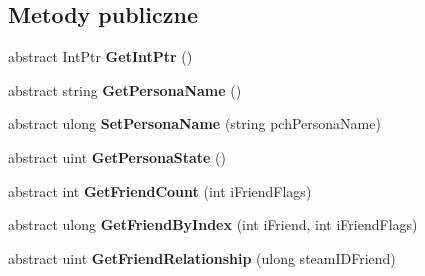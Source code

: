 \subsection*{Metody publiczne}
\begin{DoxyCompactItemize}
\item 
\mbox{\label{class_valve_1_1_steamworks_1_1_i_steam_friends_addb8dee234b12715a1f9d60a2076c8b0}} 
abstract Int\+Ptr {\bfseries Get\+Int\+Ptr} ()
\item 
\mbox{\label{class_valve_1_1_steamworks_1_1_i_steam_friends_a2e4a7aa02bb0b7a4a651fda2425796df}} 
abstract string {\bfseries Get\+Persona\+Name} ()
\item 
\mbox{\label{class_valve_1_1_steamworks_1_1_i_steam_friends_a7aa0807c91ae882846cc8d69b2d803cf}} 
abstract ulong {\bfseries Set\+Persona\+Name} (string pch\+Persona\+Name)
\item 
\mbox{\label{class_valve_1_1_steamworks_1_1_i_steam_friends_a119f400db8b21a57103441da835ad509}} 
abstract uint {\bfseries Get\+Persona\+State} ()
\item 
\mbox{\label{class_valve_1_1_steamworks_1_1_i_steam_friends_aaa81d3f377380a8c459816e7ea03d88c}} 
abstract int {\bfseries Get\+Friend\+Count} (int i\+Friend\+Flags)
\item 
\mbox{\label{class_valve_1_1_steamworks_1_1_i_steam_friends_afcce033a23dd98f7820274dca185e1f6}} 
abstract ulong {\bfseries Get\+Friend\+By\+Index} (int i\+Friend, int i\+Friend\+Flags)
\item 
\mbox{\label{class_valve_1_1_steamworks_1_1_i_steam_friends_a2b0f6b75ea9f11c44cc226f3cfaafd82}} 
abstract uint {\bfseries Get\+Friend\+Relationship} (ulong steam\+I\+D\+Friend)
\item 
\mbox{\label{class_valve_1_1_steamworks_1_1_i_steam_friends_a0d21cb4e1225c82f4bb732250738759d}} 

\end{DoxyCompactItemize}
